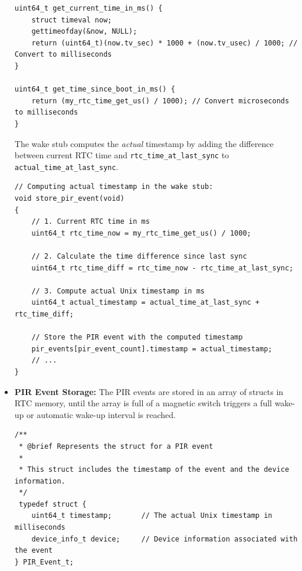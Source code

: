 \documentclass[A4,10pt]{article}
\begin{document}
\begin{itemize}
\begin{verbatim}
uint64_t get_current_time_in_ms() {
    struct timeval now;
    gettimeofday(&now, NULL);
    return (uint64_t)(now.tv_sec) * 1000 + (now.tv_usec) / 1000; // Convert to milliseconds
}

uint64_t get_time_since_boot_in_ms() {
    return (my_rtc_time_get_us() / 1000); // Convert microseconds to milliseconds
}

\end{verbatim}
      The wake stub computes the \emph{actual} timestamp by adding the difference between current RTC time and \texttt{rtc\_time\_at\_last\_sync} to \texttt{actual\_time\_at\_last\_sync}.
\begin{verbatim}
// Computing actual timestamp in the wake stub:
void store_pir_event(void)
{
    // 1. Current RTC time in ms
    uint64_t rtc_time_now = my_rtc_time_get_us() / 1000;

    // 2. Calculate the time difference since last sync
    uint64_t rtc_time_diff = rtc_time_now - rtc_time_at_last_sync;

    // 3. Compute actual Unix timestamp in ms
    uint64_t actual_timestamp = actual_time_at_last_sync + rtc_time_diff;

    // Store the PIR event with the computed timestamp
    pir_events[pir_event_count].timestamp = actual_timestamp;
    // ...
}
\end{verbatim}
    \item \textbf{PIR Event Storage:}
	The PIR events are stored in an array of structs in RTC memory, until the array is full of a magnetic switch triggers a full wake-up or automatic wake-up interval is reached.
	\begin{verbatim}
/**
 * @brief Represents the struct for a PIR event
 *
 * This struct includes the timestamp of the event and the device information.
 */
 typedef struct {
    uint64_t timestamp;       // The actual Unix timestamp in milliseconds
    device_info_t device;     // Device information associated with the event
} PIR_Event_t;


\end{verbatim}
\end{itemize}
\end{document}
